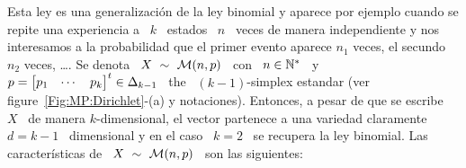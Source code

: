\label{Sssec:MP:Multinomial}

Esta ley es una generalizaci\'on de la ley binomial y aparece por ejemplo cuando
se  repite  una  experiencia  a  \  $k$  \ estados  \  $n$  \  veces  de  manera
independiente y nos  interesamos a la probabilidad que  el primer evento aparece
$n_1$ veces, el secundo $n_2$ veces, \ldots.  Se denota \ $X \ \sim \ \M(n,p)$ \
con  \  $n   \in  \mathbb{N}^*$  \  y   \  $p  =  \begin{bmatrix}  p_1   &  \cdots  &
  p_k  \end{bmatrix}^t \in  \Delta_{k-1}$ \  the \  $(k-1)$-simplex  estandar (ver
figure~\ref{Fig:MP:Dirichlet}-(a)  y notaciones).  Entonces, a  pesar de  que se
escribe \  $X$ \ de manera  $k$-dimensional, el vector partenece  a una variedad
claramente \ $d = k-1$ \ dimensional y en el caso \ $k = 2$ \ se recupera la ley
binomial.  Las caracter\'isticas de \ $X \ \sim \ \M(n,p)$ \ son las siguientes:

